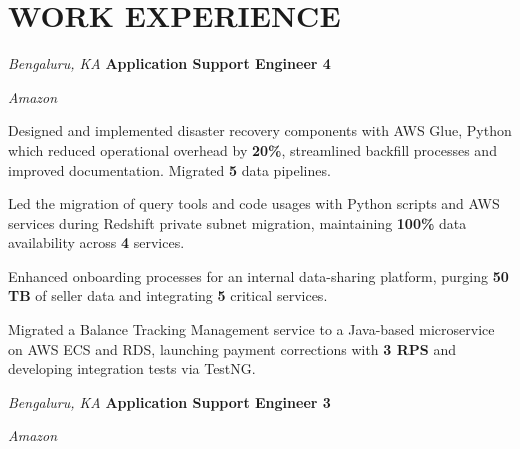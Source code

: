 \section{WORK EXPERIENCE}

\begin{twocolentry}{
    \textit{Bengaluru, KA}}
    \textbf{Application Support Engineer 4}
    
    \textit{Amazon}
\end{twocolentry}

\vspace{0.15 cm}
\begin{onecolentry}
    \begin{highlights}
        \item Designed and implemented disaster recovery components with AWS Glue, Python which reduced operational overhead by \textbf{20\%}, streamlined backfill processes and improved documentation. Migrated \textbf{5} data pipelines.
        \item Led the migration of query tools and code usages with Python scripts and AWS services during Redshift private subnet migration, maintaining \textbf{100\%} data availability across \textbf{4} services.
        \item Enhanced onboarding processes for an internal data-sharing platform, purging \textbf{50 TB} of seller data and integrating \textbf{5} critical services.
        \item Migrated a Balance Tracking Management service to a Java-based microservice on AWS ECS and RDS, launching payment corrections with \textbf{3 RPS} and developing integration tests via TestNG.
    \end{highlights}
\end{onecolentry}

\vspace{0.15 cm}

\begin{twocolentry}{
    \textit{Bengaluru, KA}}
    \textbf{Application Support Engineer 3}
    
    \textit{Amazon}
\end{twocolentry}

\vspace{0.15 cm}

